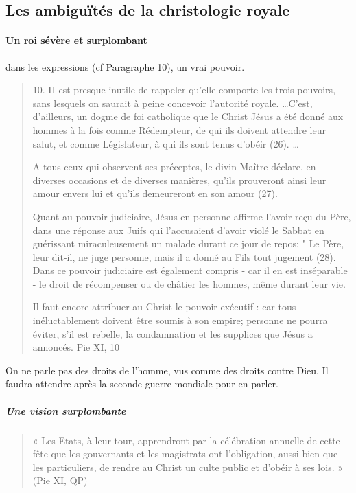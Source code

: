 \subsection{Les ambiguïtés de la christologie royale} 

\paragraph{Un roi sévère et surplombant} dans les expressions (cf Paragraphe 10), un vrai pouvoir.

\begin{quote}
    10. II est presque inutile de rappeler qu'elle comporte les trois pouvoirs, sans lesquels on saurait à peine concevoir l'autorité royale. \ldots C'est, d'ailleurs, un dogme de foi catholique que le Christ Jésus a été donné aux hommes à la fois comme Rédempteur, de qui ils doivent attendre leur salut, et comme Législateur, à qui ils sont tenus d'obéir (26). \ldots

A tous ceux qui observent ses préceptes, le divin Maître déclare, en diverses occasions et de diverses manières, qu'ils prouveront ainsi leur amour envers lui et qu'ils demeureront en son amour (27).

Quant au pouvoir judiciaire, Jésus en personne affirme l'avoir reçu du Père, dans une réponse aux Juifs qui l'accusaient d'avoir violé le Sabbat en guérissant miraculeusement un malade durant ce jour de repos: " Le Père, leur dit-il, ne juge personne, mais il a donné au Fils tout jugement (28). Dans ce pouvoir judiciaire est également compris - car il en est inséparable - le droit de récompenser ou de châtier les hommes, même durant leur vie.

Il faut encore attribuer au Christ le pouvoir exécutif : car tous inéluctablement doivent être soumis à son empire; personne ne pourra éviter, s'il est rebelle, la condamnation et les supplices que Jésus a annoncés.
Pie XI, 10
\end{quote}

On ne parle pas des droits de l'homme, vus comme des droits contre Dieu. Il faudra attendre après la seconde guerre mondiale pour en parler.

\subparagraph{Une vision surplombante}
\begin{quote}
    « Les Etats, à leur tour, apprendront par la célébration annuelle de cette fête que les gouvernants et les magistrats ont l'obligation, aussi bien que les particuliers, de rendre au Christ un culte public et d'obéir à ses lois. » (Pie XI, QP) 
\end{quote}

